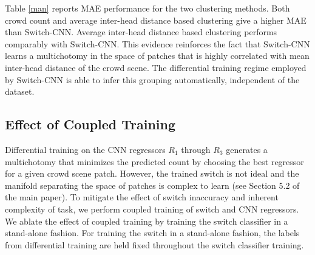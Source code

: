 \documentclass[10pt,twocolumn,letterpaper]{article}
\begin{document}
Table \ref{man} reports  MAE performance for the two clustering methods. Both crowd count and average inter-head distance based clustering give a higher MAE than Switch-CNN. Average inter-head distance based clustering performs comparably with Switch-CNN. This evidence reinforces the fact that Switch-CNN  learns a multichotomy in the space of patches that is highly correlated with mean inter-head distance of the
crowd scene. The differential training regime employed by Switch-CNN is able to infer this grouping automatically, independent of the dataset. 







\subsection{Effect of Coupled Training}
\label{a1}
Differential training on the CNN regressors $R_1$ through $R_3$ generates a multichotomy that minimizes the predicted count by choosing the best regressor for a given crowd scene patch. However, the trained switch is not ideal and the manifold separating the space of patches is complex to learn (see Section 5.2 of the main paper). To mitigate the effect of switch inaccuracy and inherent complexity of task, we perform coupled training of switch and CNN regressors. We ablate the effect of coupled training by training the switch classifier in a stand-alone fashion. For training the switch in a stand-alone fashion, the labels from differential training are held fixed throughout the switch classifier training.
\end{document}

